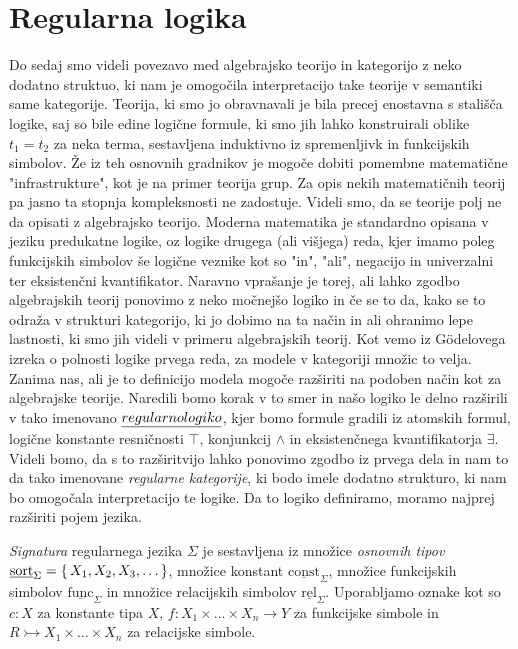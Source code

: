 \documentclass[../kategoricna_logika.tex]{subfiles}
\begin{document}
\section{Regularna logika}
Do sedaj smo videli povezavo med algebrajsko teorijo in kategorijo z neko dodatno struktuo, ki nam je omogočila interpretacijo take teorije v semantiki same kategorije. Teorija, ki smo jo obravnavali je bila precej enostavna s stališča logike, saj so bile edine logične formule, ki smo jih lahko konstruirali oblike $t_1 = t_2$ za neka terma, sestavljena induktivno iz spremenljivk in funkcijskih simbolov. 
Že iz teh osnovnih gradnikov je mogoče dobiti pomembne matematične "infrastrukture", kot je na primer teorija grup. Za opis nekih matematičnih teorij pa jasno ta stopnja kompleksnosti ne zadostuje.
Videli smo, da se teorije polj ne da opisati z algebrajsko teorijo. Moderna matematika je standardno opisana v jeziku predukatne logike, oz logike drugega (ali višjega) reda, kjer imamo poleg funkcijskih simbolov še logične veznike kot so "in", "ali", negacijo in univerzalni ter eksistenčni kvantifikator.
Naravno vprašanje je torej, ali lahko zgodbo algebrajskih teorij ponovimo z neko močnejšo logiko in če se to da, kako se to odraža v strukturi kategorijo, ki jo dobimo na ta način in ali ohranimo lepe lastnosti, ki smo jih videli v primeru algebrajskih teorij.
Kot vemo iz Gödelovega izreka o polnosti logike prvega reda, za modele v kategoriji množic to velja. Zanima nas, ali je to definicijo modela mogoče razširiti na podoben način kot za algebrajske teorije.
Naredili bomo korak v to smer in našo logiko le delno razširili v tako imenovano $\emph{regularno logiko}$, kjer bomo formule gradili iz atomskih formul, logične konstante resničnosti $\top$, konjunkcij $\wedge$ in eksistenčnega kvantifikatorja $\exists$.
Videli bomo, da s to razširitvijo lahko ponovimo zgodbo iz prvega dela in nam to da tako imenovane \emph{regularne kategorije}, ki bodo imele dodatno strukturo, ki nam bo omogočala interpretacijo te logike.
Da to logiko definiramo, moramo najprej razširiti pojem jezika.
%
\begin{definicija}
  \emph{Signatura} regularnega jezika $\Sigma$ je sestavljena iz množice \emph{osnovnih tipov} $\underline{\mathrm{sort}}_\Sigma = \left\lbrace\,X_1, X_2, X_3, \ldots\,\right\rbrace$, množice konstant $\underline{\mathrm{const}}_\Sigma$, množice funkcijskih simbolov $\underline{\mathrm{func}}_\Sigma$ in množice relacijskih simbolov $\underline{\mathrm{rel}}_\Sigma$. Uporabljamo oznake kot so $c : X$ za konstante tipa $X$, $f : X_1 \times \ldots \times X_n \to Y$ za funkcijske simbole in $R \rightarrowtail X_1 \times \ldots \times X_n$ za relacijske simbole.
\end{definicija}
\end{document}
